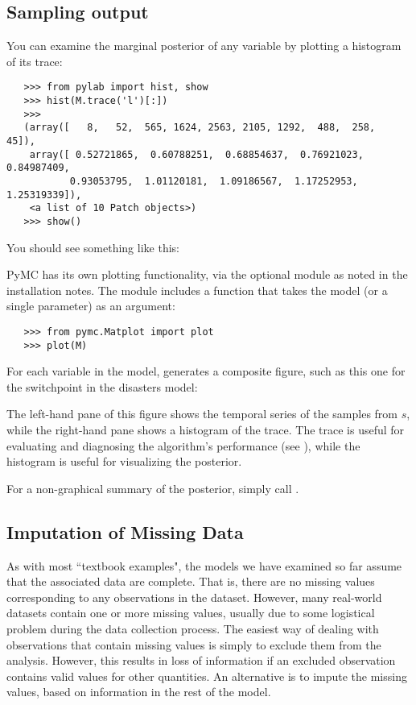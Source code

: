 \subsection{Sampling output}
You can examine the marginal posterior of any variable by plotting a histogram of its trace:
\begin{verbatim}
   >>> from pylab import hist, show
   >>> hist(M.trace('l')[:])
   >>>
   (array([   8,   52,  565, 1624, 2563, 2105, 1292,  488,  258,   45]),
    array([ 0.52721865,  0.60788251,  0.68854637,  0.76921023,  0.84987409,
           0.93053795,  1.01120181,  1.09186567,  1.17252953,  1.25319339]),
    <a list of 10 Patch objects>)
   >>> show()
\end{verbatim}
You should see something like this:
\begin{center}
\end{center}
PyMC has its own plotting functionality, via the optional
 module as noted in the installation notes. The
 module includes a  function that takes the
model (or a single parameter) as an argument:
\begin{verbatim}
   >>> from pymc.Matplot import plot
   >>> plot(M)
\end{verbatim}
For each variable in the model,  generates a composite figure, such as this one for the switchpoint in the disasters model:
\begin{center}
\end{center}
The left-hand pane of this figure shows the temporal series of the samples from $s$, while the right-hand pane shows a histogram of the trace. The trace is useful for evaluating and diagnosing the algorithm's performance (see \cite*{gelman}), while the histogram is useful for visualizing the posterior.

For a non-graphical summary of the posterior, simply call .

\hypertarget{missing}{}
\subsection{Imputation of Missing Data} %

As with most ``textbook examples", the models we have examined so far assume that the associated data are complete. That is, there are no missing values corresponding to any observations in the dataset. However, many real-world datasets contain one or more missing values, usually due to some logistical problem during the data collection process. The easiest way of dealing with observations that contain missing values is simply to exclude them from the analysis. However, this results in loss of information if an excluded observation contains valid values for other quantities. An alternative is to impute the missing values, based on information in the rest of the model.

